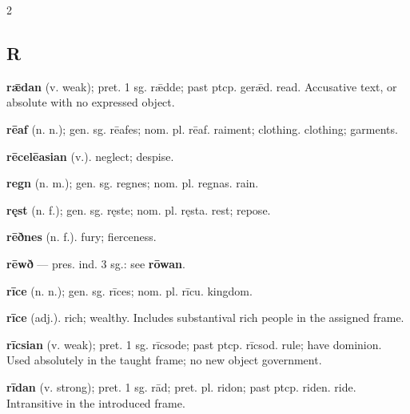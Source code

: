 \begin{multicols*}{2}
\subsection*{R}
\textbf{rǣdan} (v. weak); pret. 1 sg. rǣdde; past ptcp. gerǣd. read. Accusative text, or absolute with no expressed object.\par
\textbf{rēaf} (n. n.); gen. sg. rēafes; nom. pl. rēaf. raiment; clothing. clothing; garments.\par
\textbf{rēcelēasian} (v.). neglect; despise.\par
\textbf{regn} (n. m.); gen. sg. regnes; nom. pl. regnas. rain.\par
\textbf{ręst} (n. f.); gen. sg. ręste; nom. pl. ręsta. rest; repose.\par
\textbf{rēðnes} (n. f.). fury; fierceness.\par
\textbf{rēwð} — pres. ind. 3 sg.: see \textbf{rōwan}.\par
\textbf{rīce} (n. n.); gen. sg. rīces; nom. pl. rīcu. kingdom.\par
\textbf{rīce} (adj.). rich; wealthy. Includes substantival rich people in the assigned frame.\par
\textbf{rīcsian} (v. weak); pret. 1 sg. rīcsode; past ptcp. rīcsod. rule; have dominion. Used absolutely in the taught frame; no new object government.\par
\textbf{rīdan} (v. strong); pret. 1 sg. rād; pret. pl. ridon; past ptcp. riden. ride. Intransitive in the introduced frame.\par

\end{multicols*}
